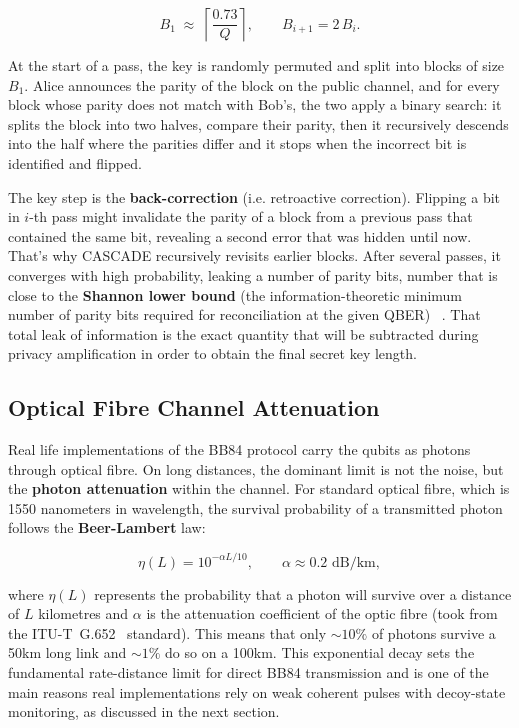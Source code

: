 \documentclass[12pt, a4paper]{article}
\begin{document}
\begin{equation*}
  B_1 \;\approx\; \left\lceil \frac{0.73}{Q} \right\rceil,
  \qquad B_{i+1} = 2\,B_i.
  \label{eq:cascade-blocksize}
\end{equation*}

At the start of a pass, the key is randomly permuted and split into blocks of size $B_1$. Alice announces the parity of the block on the public channel, and for every block whose parity does not match with Bob's, the two apply a binary search: it splits the block into two halves, compare their parity, then it recursively descends into the half where the parities differ and it stops when the incorrect bit is identified and flipped. 

The key step is the \textbf{back-correction} (i.e. retroactive correction). Flipping a bit in $i$-th pass might invalidate the parity of a block from a previous pass that contained the same bit, revealing a second error that was hidden until now. That's why CASCADE recursively revisits earlier blocks. After several passes, it converges with high probability, leaking a number of parity bits, number that is close to the \textbf{Shannon lower bound} (the information-theoretic minimum number of parity bits required for reconciliation at the given QBER) ~\cite{martinez2015cascade}. That total leak of information is the exact quantity that will be subtracted during privacy amplification in order to obtain the final secret key length. 

\subsection{Optical Fibre Channel Attenuation}
\label{sec:channel-loss}

Real life implementations of the BB84 protocol carry the qubits as photons through optical fibre. On long distances, the dominant limit is not the noise, but the \textbf{photon attenuation} within the channel. For standard optical fibre, which is 1550 nanometers in wavelength, the survival probability of a transmitted photon follows the \textbf{Beer-Lambert} law:

\begin{equation*}
  \eta(L) = 10^{-\alpha L / 10}, \qquad \alpha \approx 0.2 \text{ dB/km},
  \label{eq:fibre-attenuation}
\end{equation*}

where $\eta(L)$ represents the probability that a photon will survive over a distance of $L$ kilometres and $\alpha$ is the attenuation coefficient of the optic fibre (took from the ITU-T~G.652~\cite{ITU-T-G652} standard). This means that only $\sim10\%$ of photons survive a 50km long link and $\sim1\%$ do so on a 100km. This exponential decay sets the fundamental rate-distance limit for direct BB84 transmission and is one of the main reasons real implementations rely on weak coherent pulses with decoy-state monitoring, as discussed in the next section.
\end{document}
